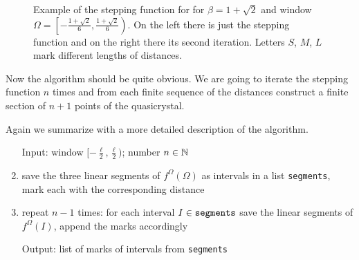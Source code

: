 \documentclass[text.tex]{subfiles}
\begin{document}
\begin{figure}[h!]
\caption{Example of the stepping function for for $\beta = 1+\sqrt{2}$ and window $\Omega = \left[-\frac{1+\sqrt{2}}{6},\frac{1+\sqrt{2}}{6}\right)$. On the left there is just the stepping function and on the right there its second iteration. Letters $S$, $M$, $L$ mark different lengths of distances. }%
\label{fig_steppingFunction}
\end{figure}

Now the algorithm should be quite obvious. We are going to iterate the stepping function $n$ times and from each finite sequence of the distances construct a finite section of $n+1$ points of the quasicrystal. 

Again we summarize with a more detailed description of the algorithm.

\begin{enumerate}
\item[Input:] window $[-\frac{\ell}{2},\frac{\ell}{2})$; number $n\in\mathbb{N}$
\item save the three linear segments of $f^\Omega(\Omega)$ as intervals in a list \texttt{segments}, mark each with the corresponding distance
\item repeat $n-1$ times: for each interval $I\in\text{\texttt{segments}}$ save the linear segments of $f^\Omega(I)$, append the marks accordingly
\item[Output:] list of marks of intervals from \texttt{segments}
\end{enumerate}
\end{document}
